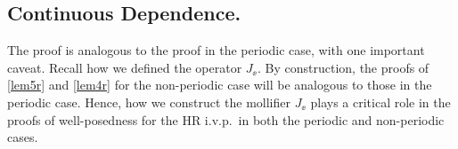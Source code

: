 \subsection{Continuous Dependence.} The proof is analogous to the proof in
the periodic case, with one important caveat. Recall how we defined the operator
$J_\ee$. By construction, the proofs of \cref{lem5r} and \cref{lem4r} for the non-periodic case will be
analogous to those in the periodic case. Hence, how we
construct the mollifier $J_\ee$ plays a critical role in the proofs of
well-posedness for the HR i.v.p.\ in both the periodic and non-periodic cases. %
%
%
%
%
%
%
%
%
%
%
